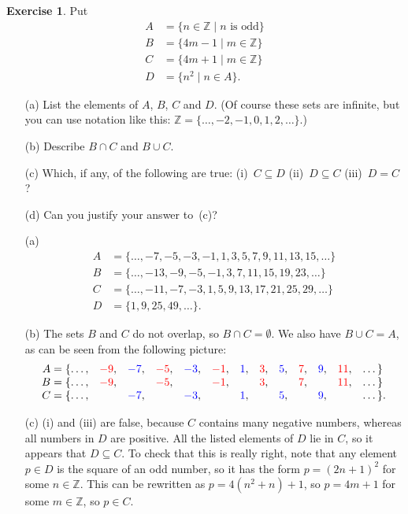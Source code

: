\documentclass[a4paper]{book}
\newcommand{\RED}[1]{{\color{red}#1}}
\newcommand{\BLUE}[1]{{\color{blue}#1}}
\newcommand{\Z}         {{\mathbb{Z}}}
\newcommand{\sse}       {\subseteq}
\newcommand{\st}        {\;|\;}
\renewcommand{\:}{\colon}
\newcommand{\ghost}{{\tiny $\color[gray]{1}.$}}
\theoremstyle{definition}
\newtheorem{exercise}[theorem]{Exercise}
\renewenvironment{solution}{\SolutionInline}{\endSolutionInline}
\begin{document}
\begin{exercise}
 Put
 \begin{align*}
  A &= \{n\in\Z\st n \text{ is odd}\} \\
  B &= \{4m-1\st m\in\Z\} \\
  C &= \{4m+1\st m\in\Z\} \\
  D &= \{n^2\st n\in A\}.
 \end{align*}
 \begin{itemize}
  \item[(a)] List the elements of $A$, $B$, $C$ and $D$.  (Of course
   these sets are infinite, but you can use notation like this:
   $\Z=\{\dotsc,-2,-1,0,1,2,\dotsc\}$.)
  \item[(b)] Describe $B\cap C$ and $B\cup C$.
  \item[(c)] Which, if any, of the following are true: (i)~$C\sse D$
   (ii)~$D\sse C$ (iii)~$D=C$?
  \item[(d)] Can you justify your answer to~(c)?
 \end{itemize}
\end{exercise}
\begin{solution}
 \begin{itemize}
  \item[(a)] \ghost\vspace{-3ex}
   \begin{align*}
    A &= \{ \dotsc,-7,-5,-3,-1,1,3,5,7,9,11,13,15,\dotsc \} \\
    B &= \{ \dotsc,-13,-9,-5,-1,3,7,11,15,19,23,\dotsc \} \\
    C &= \{ \dotsc,-11,-7,-3,1,5,9,13,17,21,25,29,\dotsc \} \\
    D &= \{ 1,9,25,49,\dotsc \}.
   \end{align*}
  \item[(b)] The sets $B$ and $C$ do not overlap, so
   $B\cap C=\emptyset$.  We also have $B\cup C=A$, as can be seen from
   the following picture:
   {\small \[ \begin{array}{rcccccccccccl}
       A=\{ \dotsc,& \RED{-9}, & \BLUE{-7}, & \RED{-5}, & \BLUE{-3},
                   & \RED{-1},  & \BLUE{1},   & \RED{3},  & \BLUE{5},
                   & \RED{7},   & \BLUE{9},  & \RED{11}, & \dotsc\} \\
       B=\{ \dotsc,& \RED{-9}, && \RED{-5}, && \RED{-1}, && \RED{3},
                   && \RED{7}, && \RED{11}, & \dotsc\} \\
       C=\{ \dotsc,&& \BLUE{-7}, && \BLUE{-3}, && \BLUE{1}, && \BLUE{5},
                   && \BLUE{9},&& \dotsc\}.
   \end{array} \]}
  \item[(c)] (i) and (iii) are false, because $C$ contains many
   negative numbers, whereas all numbers in $D$ are positive.  All the
   listed elements of $D$ lie in $C$, so it appears that $D\sse C$.
   To check that this is really right, note that any element $p\in D$
   is the square of an odd number, so it has the form $p=(2n+1)^2$ for
   some $n\in\Z$.  This can be rewritten as $p=4(n^2+n)+1$, so
   $p=4m+1$ for some $m\in\Z$, so $p\in C$.
 \end{itemize}
\end{solution}
\end{document}
